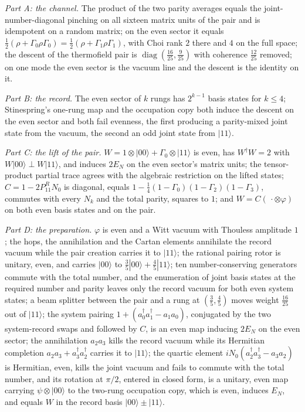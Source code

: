 \documentclass[11pt]{article}
\theoremstyle{definition}
\theoremstyle{plain}
\providecommand{\EN}{}\renewcommand{\EN}{E_{N}}
\providecommand{\G}{}\renewcommand{\G}{\Gamma}
\providecommand{\ket}{}\renewcommand{\ket}[1]{|#1\rangle}
\begin{document}
\emph{Part A: the channel.} The product of the two parity averages equals the joint-number-diagonal pinching on all sixteen matrix units of the pair and is idempotent on a random matrix; on the even sector it equals $\tfrac12(\rho + \G_{0}\rho\G_{0}) = \tfrac12(\rho + \G_{1}\rho\G_{1})$, with Choi rank $2$ there and $4$ on the full space; the descent of the thermofield pair is $\operatorname{diag}(\tfrac{16}{25}, \tfrac{9}{25})$ with coherence $\tfrac{12}{25}$ removed; on one mode the even sector is the vacuum line and the descent is the identity on it.

\emph{Part B: the record.} The even sector of $k$ rungs has $2^{k-1}$ basis states for $k \leq 4$; Stinespring's one-rung map and the occupation copy both induce the descent on the even sector and both fail evenness, the first producing a parity-mixed joint state from the vacuum, the second an odd joint state from $\ket{11}$.

\emph{Part C: the lift of the pair.} $W = 1 \otimes \ket{00} + \G_{0} \otimes \ket{11}$ is even, has $W^{\dagger}W = 2$ with $W\ket{00} \perp W\ket{11}$, and induces $2\EN$ on the even sector's matrix units; the tensor-product partial trace agrees with the algebraic restriction on the lifted states; $C = 1 - 2P^{R}_{11}N_{0}$ is diagonal, equals $1 - \tfrac14(1-\G_{0})(1-\G_{2})(1-\G_{3})$, commutes with every $N_{k}$ and the total parity, squares to $1$; and $W = C(\,\cdot \otimes \varphi)$ on both even basis states and on the pair.

\emph{Part D: the preparation.} $\varphi$ is even and a Witt vacuum with Thouless amplitude $1$; the hops, the annihilation and the Cartan elements annihilate the record vacuum while the pair creation carries it to $\ket{11}$; the rational pairing rotor is unitary, even, and carries $\ket{00}$ to $\tfrac35\ket{00} + \tfrac45\ket{11}$; ten number-conserving generators commute with the total number, and the enumeration of joint basis states at the required number and parity leaves only the record vacuum for both even system states; a beam splitter between the pair and a rung at $(\tfrac35, \tfrac45)$ moves weight $\tfrac{16}{25}$ out of $\ket{11}$; the system pairing $1 + (a^{\dagger}_{0}a^{\dagger}_{1} - a_{1}a_{0})$, conjugated by the two system-record swaps and followed by $C$, is an even map inducing $2\EN$ on the even sector; the annihilation $a_{2}a_{3}$ kills the record vacuum while its Hermitian completion $a_{2}a_{3} + a^{\dagger}_{3}a^{\dagger}_{2}$ carries it to $\ket{11}$; the quartic element $iN_{0}(a^{\dagger}_{2}a^{\dagger}_{3} - a_{3}a_{2})$ is Hermitian, even, kills the joint vacuum and fails to commute with the total number, and its rotation at $\pi/2$, entered in closed form, is a unitary, even map carrying $\psi \otimes \ket{00}$ to the two-rung occupation copy, which is even, induces $\EN$, and equals $W$ in the record basis $\ket{00} \pm \ket{11}$.
\end{document}
